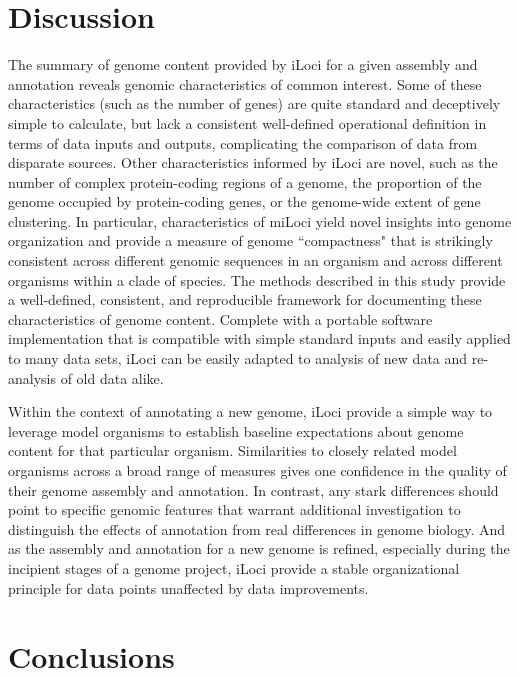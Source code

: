 \section*{Discussion}

The summary of genome content provided by iLoci for a given assembly and annotation reveals genomic characteristics of common interest.
Some of these characteristics (such as the number of genes) are quite standard and deceptively simple to calculate, but lack a consistent well-defined operational definition in terms of data inputs and outputs, complicating the comparison of data from disparate sources.
Other characteristics informed by iLoci are novel, such as the number of complex protein-coding regions of a genome, the proportion of the genome occupied by protein-coding genes, or the genome-wide extent of gene clustering.
In particular, characteristics of miLoci yield novel insights into genome organization and provide a measure of genome ``compactness" that is strikingly consistent across different genomic sequences in an organism and across different organisms within a clade of species.
The methods described in this study provide a well-defined, consistent, and reproducible framework for documenting these characteristics of genome content.
Complete with a portable software implementation that is compatible with simple standard inputs and easily applied to many data sets, iLoci can be easily adapted to analysis of new data and re-analysis of old data alike.

Within the context of annotating a new genome, iLoci provide a simple way to leverage model organisms to establish baseline expectations about genome content for that particular organism.
Similarities to closely related model organisms across a broad range of measures gives one confidence in the quality of their genome assembly and annotation.
In contrast, any stark differences should point to specific genomic features that warrant additional investigation to distinguish the effects of annotation from real differences in genome biology.
And as the assembly and annotation for a new genome is refined, especially during the incipient stages of a genome project, iLoci provide a stable organizational principle for data points unaffected by data improvements.








\section*{Conclusions}

